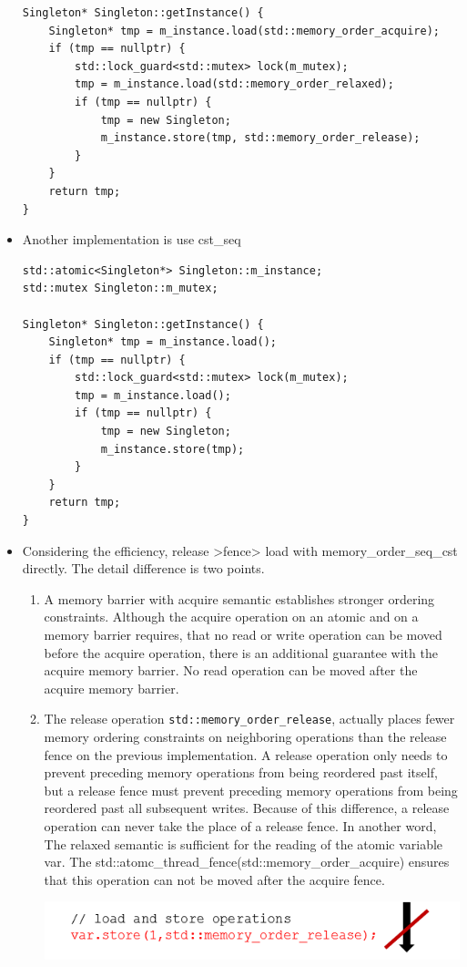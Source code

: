 \documentclass[a4paper,11pt,twoside]{book}
\begin{document}
\begin{itemize}
\begin{lstlisting}[]
Singleton* Singleton::getInstance() {
	Singleton* tmp = m_instance.load(std::memory_order_acquire);
	if (tmp == nullptr) {
		std::lock_guard<std::mutex> lock(m_mutex);
		tmp = m_instance.load(std::memory_order_relaxed);
		if (tmp == nullptr) {
			tmp = new Singleton;
			m_instance.store(tmp, std::memory_order_release);
		}
	}
	return tmp;
}	
\end{lstlisting}	
	
	\item Another implementation is use cst\_seq
\begin{lstlisting}[]
std::atomic<Singleton*> Singleton::m_instance;
std::mutex Singleton::m_mutex;

Singleton* Singleton::getInstance() {
	Singleton* tmp = m_instance.load();
	if (tmp == nullptr) {
		std::lock_guard<std::mutex> lock(m_mutex);
		tmp = m_instance.load();
		if (tmp == nullptr) {
			tmp = new Singleton;
			m_instance.store(tmp);
		}
	}
	return tmp;
}	
\end{lstlisting}	
	
	\item Considering the efficiency, release >fence> load with memory\_order\_seq\_cst directly. The detail difference is two points.
	\begin{enumerate}
		\item 	A memory barrier with acquire semantic establishes stronger ordering constraints. Although the acquire operation on an atomic and on a memory barrier requires, that no read or write operation can be moved before the acquire operation, there is an additional guarantee with the acquire memory barrier. No read operation can be moved after the acquire memory barrier.
		
		\item The release operation \texttt{std::memory\_order\_release}, actually places fewer memory ordering constraints on neighboring operations than the release fence on the previous implementation. A release operation only needs to prevent preceding memory operations from being reordered past itself, but a release fence must prevent preceding memory operations from being reordered past all subsequent writes. Because of this difference, a release operation can never take the place of a release fence. In another word, The relaxed semantic is sufficient for the reading of the atomic variable var. The std::atomc\_thread\_fence(std::memory\_order\_acquire) ensures that this operation can not be moved after the acquire fence.
		
		\begin{center}
			\includegraphics[width=0.63\linewidth]{pics/release1.png}
		\end{center}
		

\end{enumerate}
\end{itemize}
\end{document}
